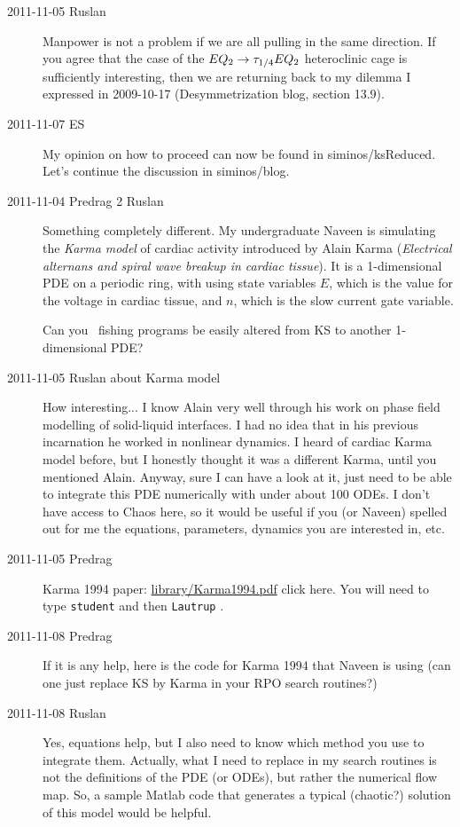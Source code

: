 \begin{description}
\item[2011-11-05 Ruslan] Manpower is not a problem if we are all pulling
in the same direction.  If you agree that the case of the
$EQ_{2} \to \tau_{1/4}EQ_{2}$ heteroclinic cage is sufficiently interesting,
then we are returning back to my dilemma
I expressed in 2009-10-17 (Desymmetrization blog, section 13.9).

\item[2011-11-07 ES] My opinion on how to proceed can now be found
in siminos/ksReduced. Let's continue the discussion in siminos/blog.

\item[2011-11-04 Predrag 2 Ruslan] Something completely different. My
undergraduate Naveen is simulating the \emph{Karma model} of cardiac
activity introduced by Alain Karma (\emph{Electrical alternans and spiral
wave breakup in cardiac tissue}). It is a 1-dimensional PDE on a
periodic ring, with using state variables $E$, which is the value for the
voltage in cardiac tissue, and $n$, which is the slow current gate
variable.

Can you \rpo\ fishing programs be easily altered from KS to another
1-dimensional PDE?

\item[2011-11-05 Ruslan about Karma model]  How interesting... I know
Alain very well through his work on phase field modelling of solid-liquid
interfaces.  I had no idea that in his previous incarnation he worked in
nonlinear dynamics.  I heard of cardiac Karma model before, but I
honestly thought it was a different Karma, until you mentioned Alain.
Anyway, sure I can have a look at it, just need to be able to integrate
this PDE numerically with under about 100 ODEs.  I don't have access to
Chaos here, so it would be useful if you (or Naveen) spelled out for me
the equations, parameters, dynamics you are interested in, etc.

\item[2011-11-05 Predrag] Karma 1994 paper:
\href{http://chaosbook.org/library/Karma1994.pdf}{library/Karma1994.pdf}
{click here}. You will need to type \texttt{student} and then \texttt{Lautrup} .

\item[2011-11-08 Predrag] If it is any help, here is the code for Karma 1994 that Naveen is using
(can one just replace KS by Karma in your RPO search routines?)

\item[2011-11-08 Ruslan] Yes, equations help, but I also need to know which method you use to integrate them.
Actually, what I need to replace in my search routines is not the definitions of the PDE (or ODEs), but rather the numerical flow map.
So, a sample Matlab code that generates a typical (chaotic?) solution of this model would be helpful.


\end{description}
